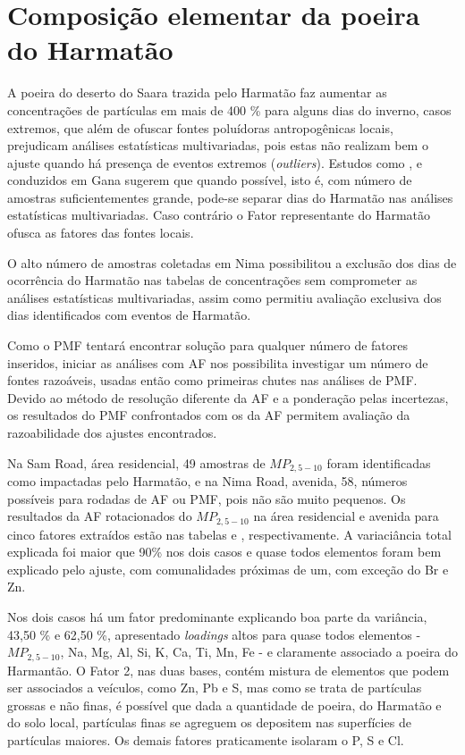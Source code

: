 \newpage
\section{Composição elementar da poeira do Harmatão}

A poeira do deserto do Saara trazida pelo Harmatão faz aumentar as concentrações
de partículas em mais de 400 \% para alguns dias do inverno, casos extremos, 
que além de ofuscar fontes poluídoras antropogênicas locais, prejudicam 
análises estatísticas multivariadas, pois estas não realizam bem o ajuste 
quando há presença de eventos extremos (\textit{outliers}). Estudos como 
\citet{aboh2009}, \citet{ofosu2013} e \citet{ofosu2012} conduzidos em Gana 
sugerem que quando possível, isto é, com número de amostras suficientementes 
grande, pode-se separar dias do Harmatão nas análises estatísticas multivariadas. 
Caso contrário o Fator representante do Harmatão ofusca as fatores das fontes 
locais. 

O alto número de amostras coletadas em Nima possibilitou a exclusão dos dias de 
ocorrência do Harmatão nas tabelas de concentrações sem comprometer as análises
estatísticas multivariadas, assim como permitiu avaliação exclusiva dos dias
identificados com eventos de Harmatão. 

Como o PMF tentará encontrar solução para qualquer número de fatores inseridos, 
iniciar as análises com AF nos possibilita investigar um número de fontes 
razoáveis, usadas então como primeiras chutes nas análises de PMF. Devido 
ao método de resolução diferente da AF e a ponderação pelas incertezas, os
resultados do PMF confrontados com os da AF permitem avaliação da 
razoabilidade dos ajustes encontrados. 

Na Sam Road, área residencial, 49 amostras de $MP_{2,5-10}$ foram identificadas 
como impactadas pelo Harmatão, e na Nima Road, avenida, 58, números possíveis 
para rodadas de AF ou PMF, pois não são muito pequenos. Os resultados 
da AF rotacionados do $MP_{2,5-10}$ na área residencial e avenida para cinco 
fatores extraídos 
estão nas tabelas \label{table:AF_RGeH5} e \label{table:AF_TGeH5}, 
respectivamente. A variaciância total explicada foi maior que 90\% nos dois  
casos e quase todos elementos foram bem explicado pelo ajuste, com comunalidades 
próximas de um, com exceção do Br e Zn. 

Nos dois casos há um fator predominante explicando boa parte da variância,
43,50 \% e 62,50 \%, apresentado \textit{loadings} altos para quase todos  
elementos - $MP_{2,5-10}$, Na, Mg, Al, Si, K, Ca, Ti, Mn, Fe - 
e claramente associado a poeira do Harmantão. 
O Fator 2, nas duas bases, contém mistura de elementos que podem ser associados 
a veículos, como Zn, Pb e S, mas como se trata de partículas grossas e não finas, 
é possível que dada a quantidade de poeira, do Harmatão e do solo local, 
partículas finas se agreguem os depositem nas superfícies de partículas maiores. 
Os demais fatores praticamente isolaram o P, S e Cl. 

